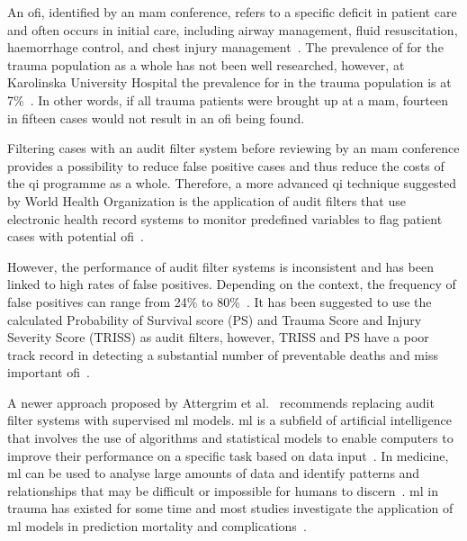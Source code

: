\documentclass[12pt, a4paper]{article}
\begin{document}
An \acrshort{ofi}, identified by an \acrshort{mam} conference, refers to a specific deficit in patient care and often
occurs in initial care, including airway management, fluid resuscitation, haemorrhage control, and chest injury
management~\cite{world_health_organization_guidelines_2009,roy_learning_2017,oreilly_opportunities_2013,sanddal_analysis_2011}.
The prevalence of  for the trauma population as a whole has not been well researched, however, at
Karolinska University Hospital the prevalence for  in the trauma population is at
7\%~\cite{attergrim_predicting_2023}. In other words, if all trauma patients were brought up at a \acrshort{mam},
fourteen in fifteen cases would not result in an \acrshort{ofi} being found.

Filtering cases with an audit filter system before reviewing by an \acrshort{mam} conference provides a possibility to
reduce false positive cases and thus reduce the costs of the \acrshort{qi} programme as a whole. Therefore, a more
advanced \acrshort{qi} technique suggested by World Health Organization is the application of audit filters that use
electronic health record systems to monitor predefined variables to flag patient cases with potential
\acrfull{ofi}~\cite{world_health_organization_guidelines_2009}.

However, the performance of audit filter systems is inconsistent and has been linked to high rates of false positives.
Depending on the context, the frequency of false positives can range from 24\% to
80\%~\cite{attergrim_predicting_2023,sanddal_analysis_2011,roy_learning_2017,ghorbani_analysis_2018}. It has been
suggested to use the calculated Probability of Survival score (PS) and Trauma Score and Injury Severity Score (TRISS)
as audit filters, however, TRISS and PS have a poor track record in detecting a substantial number of preventable
deaths and miss important \acrshort{ofi}~\cite{heim_survival_2016}.

A newer approach proposed by Attergrim et al.~\cite{attergrim_predicting_2023} recommends replacing audit filter
systems with supervised \acrfull{ml} models. \acrshort{ml} is a subfield of artificial intelligence that involves the
use of algorithms and statistical models to enable computers to improve their performance on a specific task based on
data input~\cite{greener_guide_2022}. In medicine, \acrshort{ml} can be used to analyse large amounts of data and
identify patterns and relationships that may be difficult or impossible for humans to
discern~\cite{greener_guide_2022}. \acrshort{ml} in trauma has existed for some time and most studies investigate the
application of \acrshort{ml} models in prediction mortality and complications~\cite{zhang_machine_2022}.
\end{document}

